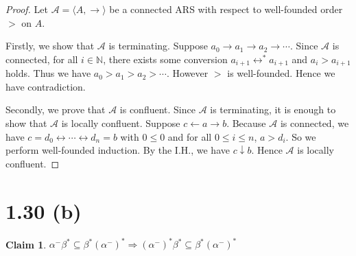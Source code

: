\documentclass[autodetect-enginem]{article}
\theoremstyle{plain}
\theoremstyle{definition}
\newtheorem*{claim*}{Claim}
\begin{document}
\begin{proof}
    Let $\mathcal{A} = \langle A, \to \rangle$ be a connected ARS with respect to well-founded order $>$ on $A$.
    
    Firstly, we show that $\mathcal{A}$ is terminating.
    Suppose $a_0 \to a_1 \to a_2 \to \cdots$.
    Since $\mathcal{A}$ is connected, for all $i \in \mathbb{N}$,
    there exists some conversion $a_{i+1} \leftrightarrow^* a_{i+1}$ and $a_i > a_{i+1}$ holds.
    Thus we have $a_0 > a_1 > a_2 > \cdots$.
    However $>$ is well-founded. Hence we have contradiction.

    Secondly, we prove that $\mathcal{A}$ is confluent.
    Since $\mathcal{A}$ is terminating,
    it is enough to show that $\mathcal{A}$ is locally confluent.
    Suppose $c \leftarrow a \to b$. Because $\mathcal{A}$ is connected,
    we have $c = d_0 \leftrightarrow \cdots \leftrightarrow d_n = b$ with $0 \leq 0$ and for all $0 \leq i \leq n$, $a > d_i$.
    So we perform well-founded induction.
    By the I.H., we have $c \downarrow b$.
    Hence $\mathcal{A}$ is locally confluent.
\end{proof}

\section*{1.30 (b)}

\begin{claim*}
    $\alpha^-\beta^* \subseteq \beta^*(\alpha^-)^* \Rightarrow (\alpha^-)^*\beta^* \subseteq \beta^*(\alpha^-)^*$
\end{claim*}
\end{document}
